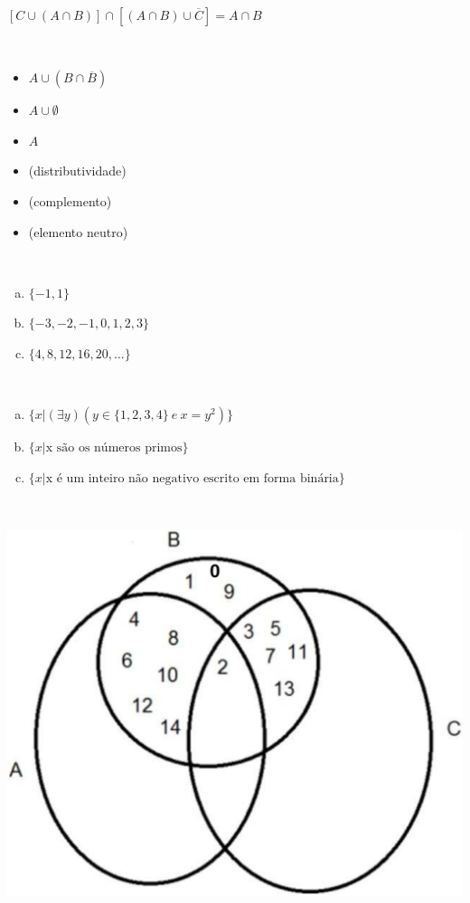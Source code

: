 \begin{Gabarito}{13}
~

    $[C \cup (A \cap B)] \cap \left[(A \cap B) \cup \overline{C}\right] = A \cap B$

\end{Gabarito}
\begin{Gabarito}{14}
~

    \begin{multicols}{2}
        \begin{itemize}
            \item $A \cup (B \cap \overline{B})$
            \item $A \cup \emptyset$
            \item $A$
        \end{itemize}

        \begin{itemize}
            \item (distributividade)
            \item (complemento)
            \item (elemento neutro)
        \end{itemize}
    \end{multicols}
\end{Gabarito}
\begin{Gabarito}{15}
~
    \begin{enumerate}[a)]
        \item $\{ -1, 1 \}$
        \item $\{ -3, -2, -1, 0, 1, 2, 3 \}$
        \item $\{{4,8,12,16,20,...} \}$
    \end{enumerate}

\end{Gabarito}
\begin{Gabarito}{16}
~

    \begin{enumerate}[a)]
        \item $\{ x | (\exists y)( y \in \{1,2,3,4\} ~ e ~ x = y^2) \}$
        \item $\{ x | \text{x são os números primos}\}$
        \item $\{{x| \text{x é um inteiro não negativo escrito em forma binária}}\}$
    \end{enumerate}

\end{Gabarito}
\begin{Gabarito}{17}
~

    \begin{center}
        \includegraphics[width=.4\linewidth]{Figs/conjuntos-cropped.pdf}
    \end{center}

\end{Gabarito}
